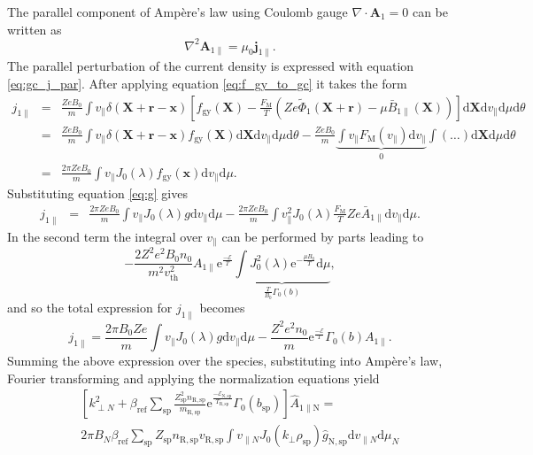 \documentclass[a4paper,10pt]{article}
\newcommand{\st}[1]{\mathrm{#1}} %
\renewcommand{\vec}[1]{\mathbf{#1}}
\begin{document}
The parallel component of Amp\`ere's law using Coulomb gauge $\nabla \cdot \mathbf{A}_1 = 0$ can be written as
\begin{equation} 
 \nabla^2 \mathbf{A}_{1 \parallel} = \mu_0 \mathbf{j}_{1 \parallel}. 
 \label{eq:ampere}
\end{equation}
The parallel perturbation of the current density is expressed with equation \ref{eq:gc_j_par}. After applying equation \ref{eq:f_gy_to_gc} it takes the form
\begin{eqnarray*}
	j_{1 \parallel} &=& \frac{Z e B_0}{m} \int v_{\parallel} \delta(\vec{X}+\vec{r}-\vec{x}) \left[ f_{\st{gy}}(\vec{X}) - \frac{F_{\st{M}}}{T} \left( Z e \widetilde{\Phi}_1(\vec{X} + \vec{r}) - \mu \bar{B}_{1 \parallel}(\vec{X}) \right) \right] \mathrm{d} \vec{X} \mathrm{d} v_{\parallel} \mathrm{d} \mu \mathrm{d} \theta \\
	&=& \frac{Z e B_0}{m} \int v_{\parallel} \delta(\vec{X}+\vec{r}-\vec{x}) f_{\st{gy}}(\vec{X}) \mathrm{d} \vec{X} \mathrm{d} v_{\parallel} \mathrm{d} \mu \mathrm{d} \theta - \frac{Z e B_0}{m} \underbrace{\int v_{\parallel} F_{\st{M}}(v_{\parallel}) \mathrm{d} v_{\parallel}}_{0} \int (\dots) \mathrm{d} \vec{X} \mathrm{d} \mu \mathrm{d} \theta \\
	&=& \frac{2 \pi Z e B_0}{m} \int v_{\parallel} J_0(\lambda) f_{\st{gy}}(\vec{x}) \mathrm{d} v_{\parallel} \mathrm{d} \mu.
\end{eqnarray*}
Substituting equation \ref{eq:g} gives
\begin{eqnarray*}
	j_{1 \parallel} &=& \frac{2 \pi Z e B_0}{m} \int v_{\parallel} J_0(\lambda) g \mathrm{d} v_{\parallel} \mathrm{d} \mu - \frac{2 \pi Z e B_0}{m} \int v_{\parallel}^2 J_0(\lambda) \frac{F_{\st{M}}}{T} Z e \bar{A}_{1 \parallel} \mathrm{d} v_{\parallel} \mathrm{d} \mu.
\end{eqnarray*}
In the second term the integral over $v_{\parallel}$ can be performed by parts leading to
\[-\frac{ 2 Z^2 e^2 B_0 n_0}{ m^2 v_{\st{th}}^{2}} A_{1 \parallel} \st{e}^{\frac{-\mathcal{E}}{T}} \underbrace{\int J_0^2(\lambda) \mathrm{e}^{-\frac{\mu B_0}{T}} \mathrm{d} \mu}_{\frac{T}{B_0} \Gamma_0(b)},\]
and so the total expression for $j_{1 \parallel}$ becomes
\[j_{1 \parallel} = \frac{2 \pi B_0 Z e}{m} \int v_{\parallel} J_0(\lambda) g \mathrm{d} v_{\parallel} \mathrm{d} \mu - \frac{Z^2 e^2 n_0}{m} \st{e}^{\frac{-\mathcal{E}}{T}} \Gamma_0(b) A_{1 \parallel}. \]
Summing the above expression over the species, substituting into Amp\`ere's law, Fourier transforming and applying the normalization equations yield
\begin{eqnarray}
	&& \left[ k_{\perp N}^2 + \beta_{\st{ref}} \sum_{\st{sp}} \frac{Z_{\st{sp}}^2 n_{\st{R,sp}}}{m_{\st{R,sp}}} \st{e}^{\frac{-\mathcal{E}_{\st{N,sp}}}{T_{\st{R,sp}}}} \Gamma_0(b_{\st{sp}}) \right] \hat{A}_{1 \parallel \st{N}} = \nonumber \\
	&& 2 \pi B_{N} \beta_{\st{ref}} \sum_{\st{sp}} Z_{\st{sp}} n_{\st{R,sp}} v_{\st{R,sp}} \int v_{\parallel N} J_0(k_{\perp} \rho_{\st{sp}}) \hat{g}_{\st{N,sp}} \mathrm{d} v_{\parallel N} \mathrm{d} \mu_{N}
	\label{eq:apar}
\end{eqnarray}
\end{document}
